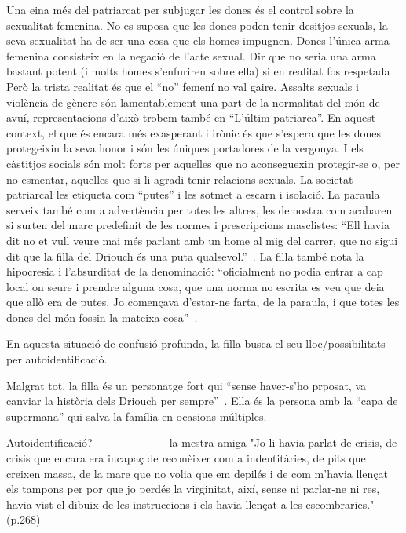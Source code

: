 Una eina més del patriarcat per subjugar les dones és el control sobre la sexualitat femenina.
No es suposa que les dones poden tenir desitjos sexuals, la seva sexualitat ha de ser una cosa que els homes impugnen.
Doncs l'única arma femenina consisteix en la negació de l'acte sexual.
Dir que no seria una arma bastant potent (i molts homes s'enfuriren sobre ella) si en realitat fos respetada~\autocite{Penny2014}.
Però la trista realitat és que el ``no'' femení no val gaire.
Assalts sexuals i violència de gènere són lamentablement una part de la normalitat del món de avuí, representacions d'això trobem també en ``L'últim patriarca''.
En aquest context, el que és encara més exasperant i irònic és que s'espera que les dones protegeixin la seva honor i són les úniques portadores de la vergonya.
I els càstitjos socials són molt forts per aquelles que no aconseguexin protegir-se o, per no esmentar, aquelles que si li agradi tenir relacions sexuals.
La societat patriarcal les etiqueta com ``putes'' i les sotmet a escarn i isolació.
La paraula serveix també com a advertència per totes les altres, les demostra com acabaren si surten del marc predefinit de les normes i prescripcions masclistes:
``Ell havia dit no et vull veure mai més parlant amb un home al mig del carrer, que no sigui dit que la filla del Driouch és una puta qualsevol.''~\autocite[269]{ElHachmi2008}.
La filla també nota la hipocresia i l'absurditat de la denominació:
``oficialment no podia entrar a cap local on seure i prendre alguna cosa, que una norma no escrita es veu que deia que allò era de putes. Jo començava d'estar-ne farta, de la paraula, i que totes les dones del món fossin la mateixa cosa''~\autocite[285]{ElHachmi2008}.

En aquesta situació de confusió profunda, la filla busca el seu lloc/possibilitats per autoidentificació.

Malgrat tot, la filla és un personatge fort qui ``sense haver-s'ho prposat, va canviar la història dels Driouch per sempre''~\autocite[7]{ElHachmi2008}.
Ella és la persona amb la ``capa de supermana'' qui salva la família en ocasions múltiples.

Autoidentificació?
-------------------
la mestra amiga
"Jo li havia parlat de crisis, de crisis que encara era incapaç de reconèixer com a indentitàries, de pits que creixen massa, de la mare que no volia que em depilés i de com m'havia llençat els tampons per por que jo perdés la virginitat, així, sense ni parlar-ne ni res, havia vist el dibuix de les instruccions i els havia llençat a les escombraries." (p.268)

